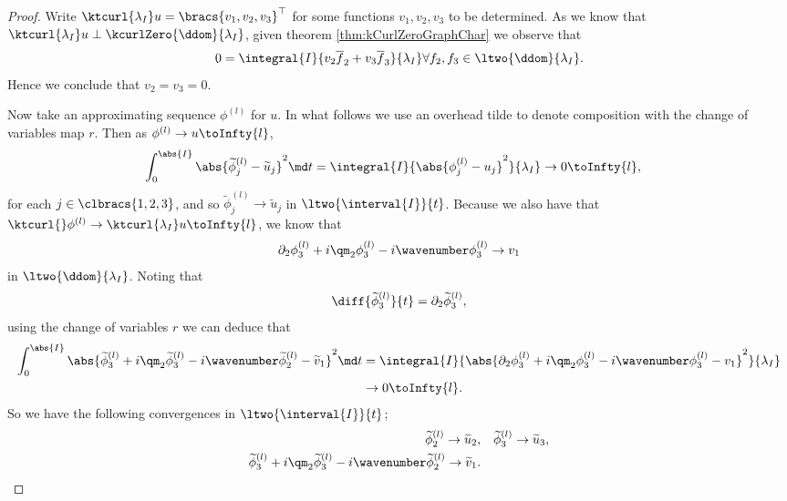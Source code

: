 \begin{proof}
	Write $\ktcurl{\lambda_I}u = \bracs{v_1, v_2, v_3}^{\top}$ for some functions $v_1,v_2,v_3$ to be determined.
	As we know that $\ktcurl{\lambda_I}u \perp \kcurlZero{\ddom}{\lambda_I}$, given theorem \ref{thm:kCurlZeroGraphChar} we observe that
	\begin{align*}
		0 = \integral{I}{v_2\overline{f}_2 + v_3\overline{f}_3}{\lambda_I} \forall f_2,f_3\in\ltwo{\ddom}{\lambda_I}.
	\end{align*}
	Hence we conclude that $v_2=v_3=0$. \newline
	
	Now take an approximating sequence $\phi^{(l)}$ for $u$.
	In what follows we use an overhead tilde to denote composition with the change of variables map $r$.
	Then as $\phi^{(l)}\rightarrow u \toInfty{l}$,
	\begin{align*}
		\int_0^{\abs{I}}\abs{\widetilde{\phi}^{(l)}_j - \widetilde{u}_j}^2 \md t
		&= \integral{I}{\abs{\phi^{(l)}_j - u_j}^2}{\lambda_I}
		\rightarrow 0 \toInfty{l},
	\end{align*}
	for each $j\in\clbracs{1,2,3}$, and so $\widetilde{\phi}^{(l)}_j\rightarrow\widetilde{u}_j$ in $\ltwo{\interval{I}}{t}$.
	Because we also have that $\ktcurl{}\phi^{(l)}\rightarrow \ktcurl{\lambda_I}u \toInfty{l}$, we know that
	\begin{align*}
		\partial_2\phi^{(l)}_3 + i\qm_2\phi^{(l)}_3 - i\wavenumber\phi^{(l)}_3 \rightarrow v_1
	\end{align*}
	in $\ltwo{\ddom}{\lambda_I}$.
	Noting that 
	\begin{align*}
		\diff{\widetilde{\phi}^{(l)}_3}{t} = \partial_2\widetilde{\phi}^{(l)}_3,
	\end{align*}
	using the change of variables $r$ we can deduce that
	\begin{align*}
		\int_0^{\abs{I}}\abs{\widetilde{\phi}^{(l)}_3 + i\qm_2\widetilde{\phi}^{(l)}_3 - i\wavenumber\widetilde{\phi}^{(l)}_2 - \widetilde{v}_1}^2 \md t
		&= \integral{I}{\abs{\partial_2\phi^{(l)}_3 + i\qm_2\phi^{(l)}_3 - i\wavenumber\phi^{(l)}_3 - v_1}^2}{\lambda_I} \\
		&\rightarrow 0 \toInfty{l}.
	\end{align*}
	So we have the following convergences in $\ltwo{\interval{I}}{t}$;
	\begin{align*}
		\widetilde{\phi}^{(l)}_2 \rightarrow \widetilde{u}_2,
		&\quad \widetilde{\phi}^{(l)}_3 \rightarrow \widetilde{u}_3, \\
		\widetilde{\phi}^{(l)}_3 + i\qm_2\widetilde{\phi}^{(l)}_3 - i\wavenumber\widetilde{\phi}^{(l)}_2 \rightarrow \widetilde{v}_1. &

\end{align*}
\end{proof}
